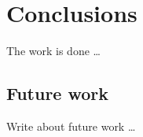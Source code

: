 \chapter{Conclusions}
\label{cha:conclusions}
\vspace{0.5 cm} 

The work is done \dots

\vspace{0.5 cm} 
\section{Future work}
\label{sec:future}
\vspace{0.5 cm} 

Write about future work \dots
